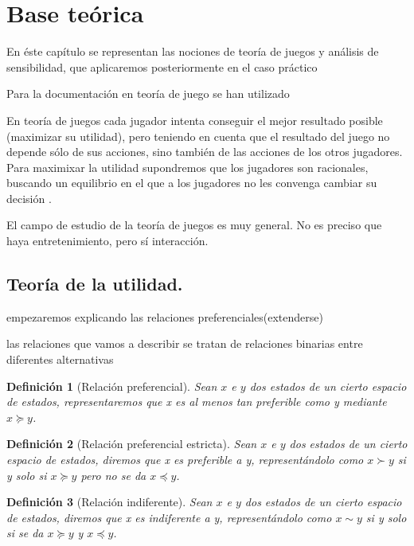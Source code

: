 \documentclass[14pt, a4paper]{article} %
\newtheorem{definicion}{Definición}[section]
\begin{document}
\tableofcontents

\newpage


\section{Base teórica}


En éste capítulo se representan las nociones de teoría de juegos y análisis de sensibilidad, que aplicaremos posteriormente en el caso práctico 

Para la documentación en teoría de juego se han utilizado


En teoría de juegos cada jugador intenta conseguir el mejor resultado posible (maximizar su utilidad), pero teniendo en cuenta que el resultado del juego no depende sólo de sus acciones, sino también de las acciones de los otros jugadores. Para maximixar la utilidad supondremos que los jugadores son racionales, buscando un equilibrio en el que a los jugadores no les convenga cambiar su decisión .


El campo de estudio de la teoría de juegos es muy general. No es preciso que haya
entretenimiento, pero sí interacción.

\subsection{Teoría de la utilidad.}

empezaremos explicando las relaciones preferenciales(extenderse)


las relaciones que vamos a describir se tratan de relaciones binarias entre diferentes alternativas

\begin{definicion}[Relación preferencial]
 Sean $x$ e $y$ dos estados de un cierto espacio de estados, representaremos que x es al menos tan preferible como y mediante $x \succeq y$. 
\end{definicion}

\begin{definicion}[Relación preferencial estricta]
Sean $x$ e $y$ dos estados de un cierto espacio de estados, diremos que x es preferible a y, representándolo como $x \succ y$ si y solo si $x \succeq y$ pero no se da $x \preceq y$. 
\end{definicion}

\begin{definicion}[Relación indiferente]
Sean $x$ e $y$ dos estados de un cierto espacio de estados, diremos que x es indiferente a y, representándolo como $x \sim y$ si y solo si se da  $x \succeq y$ y $x \preceq y$.
\end{definicion}
\end{document}
